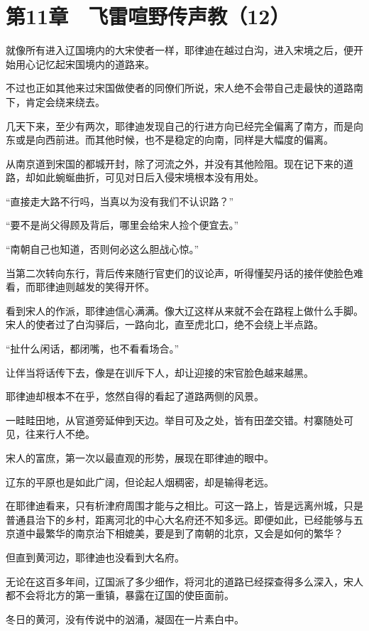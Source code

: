 \section{第11章　飞雷喧野传声教（12）}

就像所有进入辽国境内的大宋使者一样，耶律迪在越过白沟，进入宋境之后，便开始用心记忆起宋国境内的道路来。

不过也正如其他来过宋国做使者的同僚们所说，宋人绝不会带自己走最快的道路南下，肯定会绕来绕去。

几天下来，至少有两次，耶律迪发现自己的行进方向已经完全偏离了南方，而是向东或是向西前进。而其他时候，也不是稳定的向南，同样是大幅度的偏离。

从南京道到宋国的都城开封，除了河流之外，并没有其他险阻。现在记下来的道路，却如此蜿蜒曲折，可见对日后入侵宋境根本没有用处。

“直接走大路不行吗，当真以为没有我们不认识路？”

“要不是尚父得顾及背后，哪里会给宋人捡个便宜去。”

“南朝自己也知道，否则何必这么胆战心惊。”

当第二次转向东行，背后传来随行官吏们的议论声，听得懂契丹话的接伴使脸色难看，而耶律迪则越发的笑得开怀。

看到宋人的作派，耶律迪信心满满。像大辽这样从来就不会在路程上做什么手脚。宋人的使者过了白沟驿后，一路向北，直至虎北口，绝不会绕上半点路。

“扯什么闲话，都闭嘴，也不看看场合。”

让伴当将话传下去，像是在训斥下人，却让迎接的宋官脸色越来越黑。

耶律迪却根本不在乎，悠然自得的看起了道路两侧的风景。

一畦畦田地，从官道旁延伸到天边。举目可及之处，皆有田垄交错。村寨随处可见，往来行人不绝。

宋人的富庶，第一次以最直观的形势，展现在耶律迪的眼中。

辽东的平原也是如此广阔，但论起人烟稠密，却是输得老远。

在耶律迪看来，只有析津府周围才能与之相比。可这一路上，皆是远离州城，只是普通县治下的乡村，距离河北的中心大名府还不知多远。即便如此，已经能够与五京道中最繁华的南京治下相媲美，要是到了南朝的北京，又会是如何的繁华？

但直到黄河边，耶律迪也没看到大名府。

无论在这百多年间，辽国派了多少细作，将河北的道路已经探查得多么深入，宋人都不会将北方的第一重镇，暴露在辽国的使臣面前。

冬日的黄河，没有传说中的汹涌，凝固在一片素白中。

